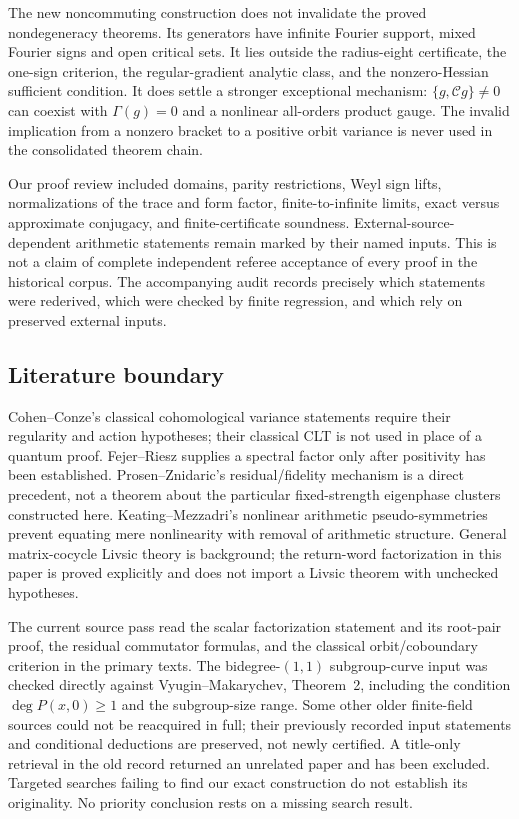The new noncommuting construction does not invalidate the proved
nondegeneracy theorems. Its generators have infinite Fourier support,
mixed Fourier signs and open critical sets. It lies outside the radius-eight
certificate, the one-sign criterion, the regular-gradient analytic class,
and the nonzero-Hessian sufficient condition. It does settle a stronger
exceptional mechanism: $\{g,\mathcal Cg\}\ne0$ can coexist with
$\Gamma(g)=0$ and a nonlinear all-orders product gauge. The invalid
implication from a nonzero bracket to a positive orbit variance is never
used in the consolidated theorem chain.

Our proof review included domains, parity restrictions, Weyl sign lifts,
normalizations of the trace and form factor, finite-to-infinite limits,
exact versus approximate conjugacy, and finite-certificate soundness.
External-source-dependent arithmetic statements remain marked by their
named inputs. This is not a claim of complete independent referee acceptance
of every proof in the historical corpus. The accompanying audit records
precisely which statements were rederived, which were checked by finite
regression, and which rely on preserved external inputs.

\subsection{Literature boundary}
Cohen--Conze's classical cohomological variance statements require their
regularity and action hypotheses; their classical CLT is not used in place
of a quantum proof. Fejer--Riesz supplies a spectral factor only after
positivity has been established. Prosen--Znidaric's residual/fidelity
mechanism is a direct precedent, not a theorem about the particular
fixed-strength eigenphase clusters constructed here. Keating--Mezzadri's
nonlinear arithmetic pseudo-symmetries prevent equating mere nonlinearity
with removal of arithmetic structure. General matrix-cocycle Livsic theory
is background; the return-word factorization in this paper is proved
explicitly and does not import a Livsic theorem with unchecked hypotheses.

The current source pass read the scalar factorization statement and its
root-pair proof, the residual commutator formulas, and the classical
orbit/coboundary criterion in the primary texts. The bidegree-$(1,1)$ subgroup-curve input was checked directly against
Vyugin--Makarychev, Theorem~2, including the condition $\deg P(x,0)\geq1$
and the subgroup-size range. Some other older finite-field
sources could not be reacquired in full; their previously recorded input
statements and conditional deductions are preserved, not newly certified.
A title-only retrieval in the old record returned an unrelated paper and
has been excluded. Targeted searches failing to find our exact construction
do not establish its originality. No priority conclusion rests on a missing
search result.

